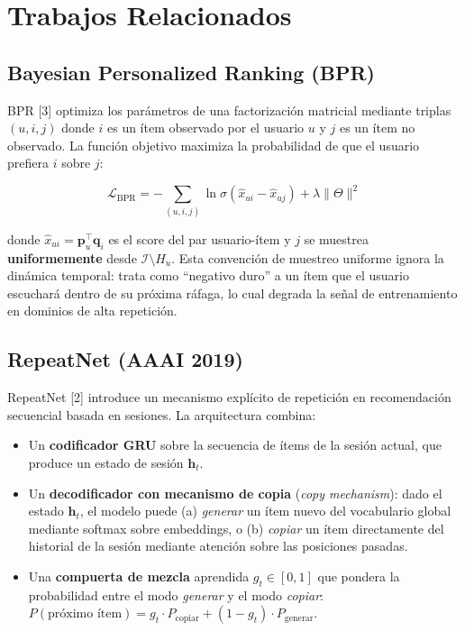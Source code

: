 \documentclass{article}
\providecommand{\tightlist}{%
  \setlength{\itemsep}{0pt}\setlength{\parskip}{0pt}}
\begin{document}
\section{Trabajos Relacionados}\label{trabajos-relacionados}

\subsection{Bayesian Personalized Ranking (BPR)}\label{bayesian-personalized-ranking-bpr}

BPR {[}3{]} optimiza los parámetros de una factorización matricial mediante triplas \((u, i, j)\) donde \(i\) es un ítem observado por el usuario \(u\) y \(j\) es un ítem no observado. La función objetivo maximiza la probabilidad de que el usuario prefiera \(i\) sobre \(j\):

\[
\mathcal{L}_{\text{BPR}} = -\sum_{(u,i,j)} \ln \sigma\!\left(\hat{x}_{ui} - \hat{x}_{uj}\right) + \lambda \lVert \Theta \rVert^2
\]

donde \(\hat{x}_{ui} = \mathbf{p}_u^\top \mathbf{q}_i\) es el score del par usuario-ítem y \(j\) se muestrea \textbf{uniformemente} desde \(\mathcal{I} \setminus H_u\). Esta convención de muestreo uniforme ignora la dinámica temporal: trata como ``negativo duro'' a un ítem que el usuario escuchará dentro de su próxima ráfaga, lo cual degrada la señal de entrenamiento en dominios de alta repetición.

\subsection{RepeatNet (AAAI 2019)}\label{repeatnet-aaai-2019}

RepeatNet {[}2{]} introduce un mecanismo explícito de repetición en recomendación secuencial basada en sesiones. La arquitectura combina:

\begin{itemize}
\tightlist
\item
  Un \textbf{codificador GRU} sobre la secuencia de ítems de la sesión actual, que produce un estado de sesión \(\mathbf{h}_t\).
\item
  Un \textbf{decodificador con mecanismo de copia} (\emph{copy mechanism}): dado el estado \(\mathbf{h}_t\), el modelo puede (a) \emph{generar} un ítem nuevo del vocabulario global mediante softmax sobre embeddings, o (b) \emph{copiar} un ítem directamente del historial de la sesión mediante atención sobre las posiciones pasadas.
\item
  Una \textbf{compuerta de mezcla} aprendida \(g_t \in [0,1]\) que pondera la probabilidad entre el modo \emph{generar} y el modo \emph{copiar}: \(P(\text{próximo ítem}) = g_t \cdot P_{\text{copiar}} + (1-g_t) \cdot P_{\text{generar}}\).
\end{itemize}
\end{document}
